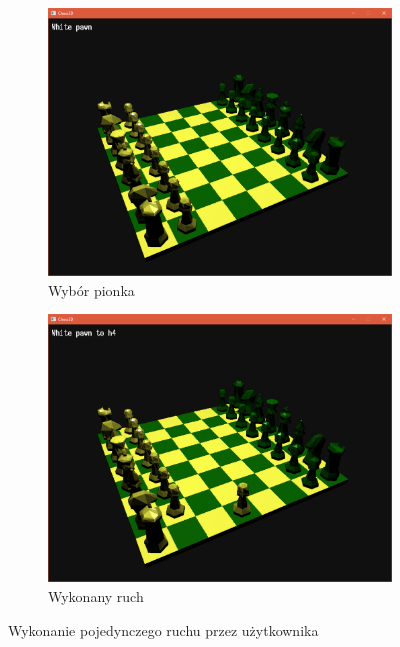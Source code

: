 \documentclass[10pt,a4paper]{article}
\begin{document}
\begin{figure}[H]
	\centering
	\begin{subfigure}[b]{0.45\textwidth}
		\includegraphics[width=\textwidth]{screenshots/01_pawn_select.png}
		\caption{Wybór pionka}
	\end{subfigure}
	\begin{subfigure}[b]{0.45\textwidth}
		\includegraphics[width=\textwidth]{screenshots/02_move_complete.png}
		\caption{Wykonany ruch}
	\end{subfigure}
	\caption{Wykonanie pojedynczego ruchu przez użytkownika}
\end{figure}
\end{document}
